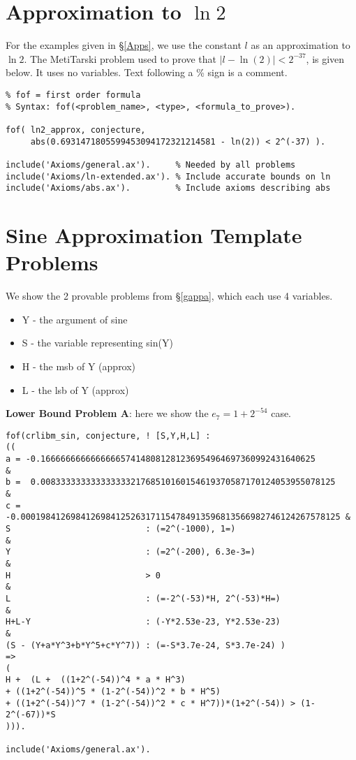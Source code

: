 \documentclass{fac}
\newcommand{\abs}[1]{\lvert#1\rvert}
\begin{document}
\section{Approximation to $\ln{2}$} \label{ln2_appendix}
For the examples given in \S \ref{Apps}, we use the constant $l$ as an approximation to $\ln{2}$. The MetiTarski problem used to prove that $\abs{l-\ln{(2)}}<2^{-37}$, is given below. It uses no variables. Text following a \% sign is a comment.
\begin{lstlisting}
% fof = first order formula
% Syntax: fof(<problem_name>, <type>, <formula_to_prove>).

fof( ln2_approx, conjecture,  
     abs(0.6931471805599453094172321214581 - ln(2)) < 2^(-37) ).

include('Axioms/general.ax').     % Needed by all problems
include('Axioms/ln-extended.ax'). % Include accurate bounds on ln
include('Axioms/abs.ax').         % Include axioms describing abs
\end{lstlisting}

\section{Sine Approximation Template Problems} \label{sine_appendix}
We show the 2 provable problems from \S \ref{gappa}, which each use 4 variables.
\begin{itemize}
    \item Y - the argument of sine
    \item S - the variable representing sin(Y)
    \item H - the msb of Y (approx)
    \item L - the lsb of Y (approx)
\end{itemize}

\noindent \textbf{Lower Bound Problem A}: here we show the $e_7=1+2^{-54}$ case. 
\begin{lstlisting}
fof(crlibm_sin, conjecture, ! [S,Y,H,L] : 
((
a = -0.1666666666666666574148081281236954964697360992431640625          &
b =  0.00833333333333333321768510160154619370587170124053955078125      &
c = -0.0001984126984126984125263171154784913596813566982746124267578125 &
S                           : (=2^(-1000), 1=)                          &  
Y                           : (=2^(-200), 6.3e-3=)                      &  
H                           > 0                                         &
L                           : (=-2^(-53)*H, 2^(-53)*H=)                 &
H+L-Y                       : (-Y*2.53e-23, Y*2.53e-23)                 &
(S - (Y+a*Y^3+b*Y^5+c*Y^7)) : (=-S*3.7e-24, S*3.7e-24) )
=>
( 
H +  (L +  ((1+2^(-54))^4 * a * H^3) 
+ ((1+2^(-54))^5 * (1-2^(-54))^2 * b * H^5) 
+ ((1+2^(-54))^7 * (1-2^(-54))^2 * c * H^7))*(1+2^(-54)) > (1-2^(-67))*S
))).

include('Axioms/general.ax').
\end{lstlisting}
\end{document}
